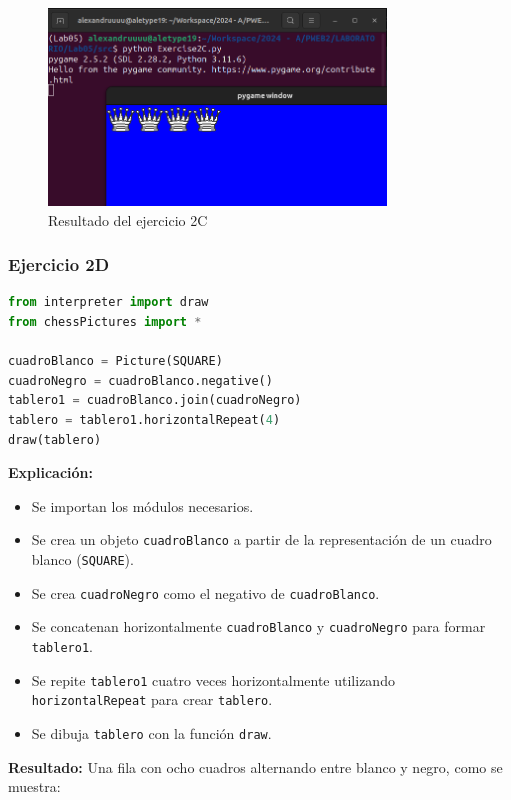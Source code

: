 \documentclass{article}
\begin{document}
\begin{itemize}
\begin{figure}[H]
    \centering
    \includegraphics[width=0.8\textwidth]{img/3.png}
    \caption{Resultado del ejercicio 2C}
    \label{fig:ejercicio2c}
\end{figure}


\subsubsection{Ejercicio 2D}

\begin{lstlisting}[language=Python, caption={Código del ejercicio 2D}]
from interpreter import draw
from chessPictures import *

cuadroBlanco = Picture(SQUARE)
cuadroNegro = cuadroBlanco.negative()
tablero1 = cuadroBlanco.join(cuadroNegro)
tablero = tablero1.horizontalRepeat(4)
draw(tablero)
\end{lstlisting}

\textbf{Explicación:}
\begin{itemize}
    \item Se importan los módulos necesarios.
    \item Se crea un objeto \texttt{cuadroBlanco} a partir de la representación de un cuadro blanco (\texttt{SQUARE}).
    \item Se crea \texttt{cuadroNegro} como el negativo de \texttt{cuadroBlanco}.
    \item Se concatenan horizontalmente \texttt{cuadroBlanco} y \texttt{cuadroNegro} para formar \texttt{tablero1}.
    \item Se repite \texttt{tablero1} cuatro veces horizontalmente utilizando \texttt{horizontalRepeat} para crear \texttt{tablero}.
    \item Se dibuja \texttt{tablero} con la función \texttt{draw}.
\end{itemize}

\textbf{Resultado:}
Una fila con ocho cuadros alternando entre blanco y negro, como se muestra:


\end{itemize}
\end{document}
